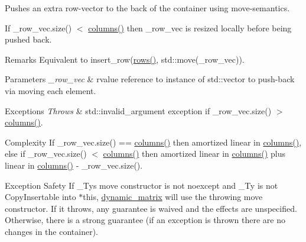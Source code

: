 Pushes an extra row-\/vector to the back of the container using move-\/semantics. 

If {\ttfamily \+\_\+row\+\_\+vec.\+size() $<$ \hyperlink{classcrsc_1_1dynamic__matrix_a43d52d7663b24b2175add500c7650d63}{columns()}} then {\ttfamily \+\_\+row\+\_\+vec} is resized locally before being pushed back.

\begin{DoxyRemark}{Remarks}
Equivalent to {\ttfamily insert\+\_\+row(\hyperlink{classcrsc_1_1dynamic__matrix_a5d167a31d3be0ac09d3abdf57a11832d}{rows()}, std\+::move(\+\_\+row\+\_\+vec))}. 
\end{DoxyRemark}

\begin{DoxyParams}{Parameters}
{\em \+\_\+row\+\_\+vec} & rvalue reference to instance of {\ttfamily std\+::vector} to push-\/back via moving each element. \\
\hline
\end{DoxyParams}

\begin{DoxyExceptions}{Exceptions}
{\em Throws} & {\ttfamily std\+::invalid\+\_\+argument} exception if {\ttfamily \+\_\+row\+\_\+vec.\+size() $>$ \hyperlink{classcrsc_1_1dynamic__matrix_a43d52d7663b24b2175add500c7650d63}{columns()}}. \\
\hline
\end{DoxyExceptions}
\begin{DoxyParagraph}{Complexity}
If {\ttfamily \+\_\+row\+\_\+vec.\+size() == \hyperlink{classcrsc_1_1dynamic__matrix_a43d52d7663b24b2175add500c7650d63}{columns()}} then amortized linear in {\ttfamily \hyperlink{classcrsc_1_1dynamic__matrix_a43d52d7663b24b2175add500c7650d63}{columns()}}, else if {\ttfamily \+\_\+row\+\_\+vec.\+size() $<$ \hyperlink{classcrsc_1_1dynamic__matrix_a43d52d7663b24b2175add500c7650d63}{columns()}} then amortized linear in {\ttfamily \hyperlink{classcrsc_1_1dynamic__matrix_a43d52d7663b24b2175add500c7650d63}{columns()}} plus linear in {\ttfamily \hyperlink{classcrsc_1_1dynamic__matrix_a43d52d7663b24b2175add500c7650d63}{columns()} -\/ \+\_\+row\+\_\+vec.\+size()}. 
\end{DoxyParagraph}
\begin{DoxyParagraph}{Exception Safety}
If {\ttfamily \+\_\+\+Ty}\textquotesingle{}s move constructor is not {\ttfamily noexcept} and {\ttfamily \+\_\+\+Ty} is not {\ttfamily Copy\+Insertable} into {\ttfamily $\ast$this}, {\ttfamily \hyperlink{classcrsc_1_1dynamic__matrix}{dynamic\+\_\+matrix}} will use the throwing move constructor. If it throws, any guarantee is waived and the effects are unspecified. Otherwise, there is a strong guarantee (if an exception is thrown there are no changes in the container). 
\end{DoxyParagraph}
